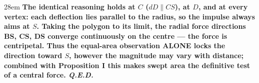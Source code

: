 \documentclass[border=4pt]{standalone}
\begin{document}
\begin{varwidth}{28em}
\large\bfseries
The identical reasoning holds at $C$ ($dD \parallel CS$), at $D$, and at every vertex: each deflection lies parallel to the radius, so the impulse always aims at $S$. Taking the polygon to its limit, the \textcolor{radialred}{radial force directions BS, CS, DS} converge continuously on the centre — the force is centripetal. Thus the equal-area observation ALONE locks the direction toward $S$, however the magnitude may vary with distance; combined with Proposition I this makes swept area the definitive test of a central force. \textit{Q.E.D.}
\end{varwidth}
\end{document}
